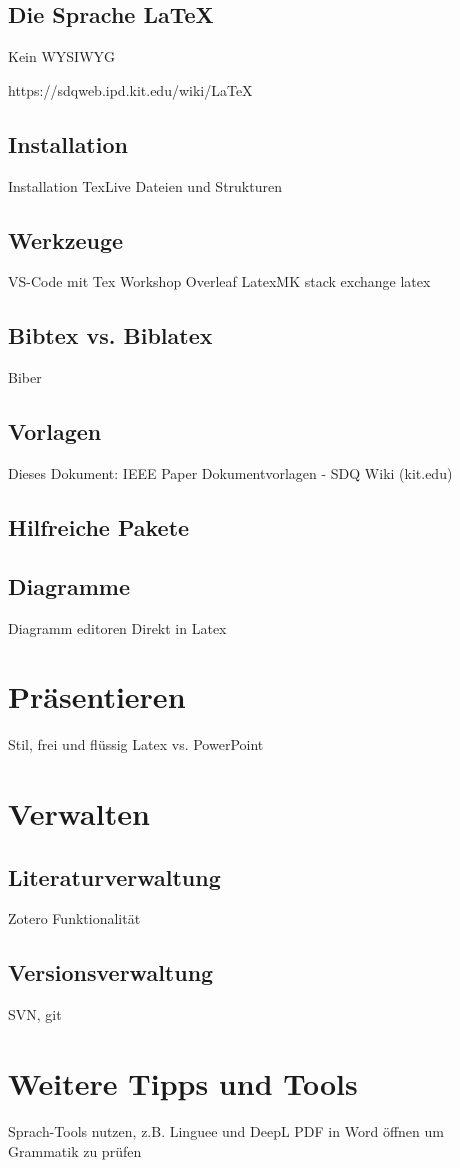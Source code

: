\subsection{Die Sprache \LaTeX}

Kein WYSIWYG

https://sdqweb.ipd.kit.edu/wiki/LaTeX

\subsection{Installation}
Installation
TexLive
Dateien und Strukturen

\subsection{Werkzeuge}

VS-Code mit Tex Workshop
Overleaf
LatexMK
stack exchange latex



\subsection{Bibtex vs. Biblatex}

Biber

\subsection{Vorlagen}

Dieses Dokument: IEEE Paper
Dokumentvorlagen - SDQ Wiki (kit.edu)

\subsection{Hilfreiche Pakete}

\subsection{Diagramme}

Diagramm editoren
Direkt in Latex

\section{Präsentieren}

Stil, frei und flüssig
Latex vs. PowerPoint

\section{Verwalten}

\subsection{Literaturverwaltung}

Zotero
Funktionalität

\subsection{Versionsverwaltung}

SVN, git

\section{Weitere Tipps und Tools}

Sprach-Tools nutzen, z.B. Linguee und DeepL
PDF in Word öffnen um Grammatik zu prüfen